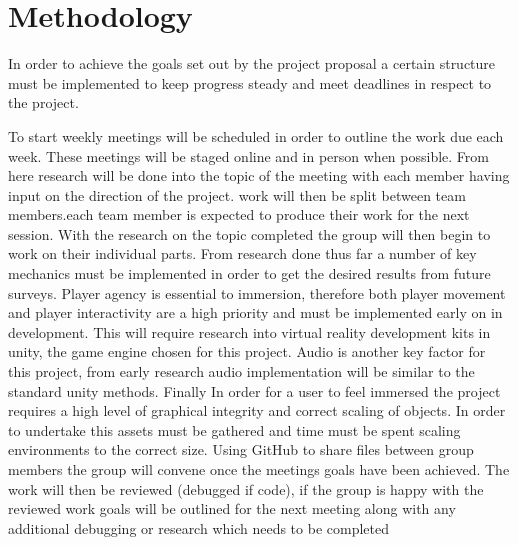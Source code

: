 
\chapter{Methodology}

In order to achieve the goals set out by the project proposal a certain structure must be implemented to keep progress steady and meet deadlines in respect to the project. 

To start weekly meetings will be scheduled in order to outline the work due each week. These meetings will be staged online and in person when possible. From here research will be done into the topic of the meeting with each member having input on the direction of the project. work will then be split between team members.each team member is expected to produce their work for the next session. With the research on the topic completed the group will then begin to work on their individual parts. From research done thus far a number of key mechanics must be implemented in order to get the desired results from future surveys. Player agency is essential to immersion, therefore both player movement and player interactivity are a high priority and must be implemented early on in development. This will require research into virtual reality development kits in unity, the game engine chosen for this project. Audio is another key factor for this project, from early research audio implementation will be similar to the standard unity methods. Finally In order for a user to feel immersed the project requires a high level of graphical integrity and correct scaling of objects. In order to undertake this assets must be gathered and time must be spent scaling environments to the correct size. Using GitHub to share files between group members the group will convene once the meetings goals have been achieved. The work will then be reviewed (debugged if code), if the group is happy with the reviewed work goals will be outlined for the next meeting along with any additional debugging or research which needs to be completed 

